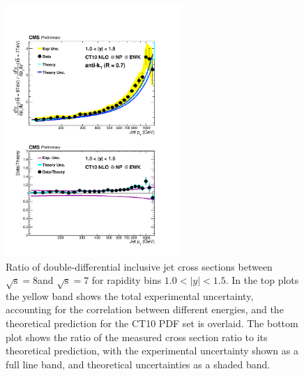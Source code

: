 \documentclass{PoS}
\begin{document}
\begin{figure}[hbpt]
  \centering
  \includegraphics[width=0.6\textwidth]{Figure3.pdf}
  \caption{Ratio of double-differential inclusive jet cross sections
    between $\mathrm{\sqrt{s}=8}$\TeV and $\mathrm{\sqrt{s}=7}$\TeV
    for rapidity bins $1.0 < |y| < 1.5$. In the top plots the yellow band shows the total
    experimental uncertainty, accounting for the correlation between
    different energies, and the theoretical prediction for the CT10
    PDF set is overlaid. The bottom plot shows the ratio of the measured
    cross section ratio to its theoretical prediction, with the
    experimental uncertainty shown as a full line band, and
    theoretical uncertainties as a shaded band.}
  \label{fig:ratio8to7}
\end{figure}
\end{document}
